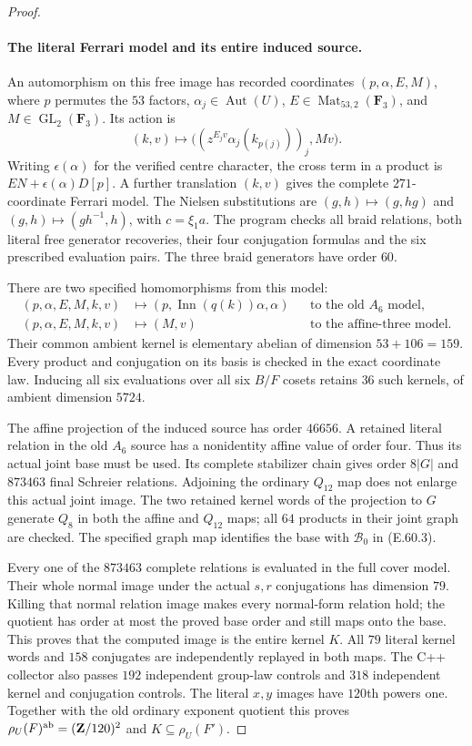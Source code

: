\begin{proof}
\paragraph{The literal Ferrari model and its entire induced source.}
An automorphism on this free image has recorded coordinates
$(p,\alpha,E,M)$, where $p$ permutes the $53$ factors,
$\alpha_j\in\operatorname{Aut}(U)$, $E\in\operatorname{Mat}_{53,2}(\mathbf F_3)$,
and $M\in\operatorname{GL}_2(\mathbf F_3)$. Its action is
\[
 (k,v)\longmapsto
       \bigl((z^{E_jv}\alpha_j(k_{p(j)}))_j,Mv\bigr).
 \tag{E.60.9}
\]
Writing $\epsilon(\alpha)$ for the verified centre character,
the cross term in a product is
$EN+\epsilon(\alpha)D[p]$. A further translation $(k,v)$
gives the complete $271$-coordinate Ferrari model.
The Nielsen substitutions are $(g,h)\mapsto(g,hg)$ and
$(g,h)\mapsto(gh^{-1},h)$, with $c=\xi_1a$.
The program checks all braid relations, both literal free
generator recoveries, their four conjugation formulas and
the six prescribed evaluation pairs. The three braid
generators have order $60$.

There are two specified homomorphisms from this model:
\[
 \begin{aligned}
 (p,\alpha,E,M,k,v)&\longmapsto
              (p,\operatorname{Inn}(q(k))\alpha,\alpha)
                       &&\text{to the old $A_6$ model},\\
 (p,\alpha,E,M,k,v)&\longmapsto(M,v)
                       &&\text{to the affine-three model}.
 \end{aligned}
 \tag{E.60.10}
\]
Their common ambient kernel is elementary abelian of
dimension $53+106=159$. Every product and conjugation
on its basis is checked in the exact coordinate law.
Inducing all six evaluations over all six $B/F$ cosets
retains $36$ such kernels, of ambient dimension $5724$.

The affine projection of the induced source has order
$46656$. A retained literal relation in the old $A_6$
source has a nonidentity affine value of order four.
Thus its actual joint base must be used. Its complete
stabilizer chain gives order $8|G|$ and $873463$ final
Schreier relations. Adjoining the ordinary $Q_{12}$ map
does not enlarge this actual joint image. The two retained
kernel words of the projection to $G$ generate $Q_8$ in
both the affine and $Q_{12}$ maps; all $64$ products in
their joint graph are checked. The specified graph map
identifies the base with $\mathcal B_0$ in
\textup{(E.60.3)}.

Every one of the $873463$ complete relations is evaluated
in the full cover model. Their whole normal image under
the actual $s,r$ conjugations has dimension $79$.
Killing that normal relation image makes every normal-form
relation hold; the quotient has order at most the proved
base order and still maps onto the base. This proves that
the computed image is the entire kernel $K$.
All $79$ literal kernel words and $158$ conjugates are
independently replayed in both maps. The C++ collector
also passes $192$ independent group-law controls and
$318$ independent kernel and conjugation controls.
The literal $x,y$ images have $120$th powers one.
Together with the old ordinary exponent quotient this
proves $\rho_U(F)^{\rm ab}=(\mathbf Z/120)^2$ and
$K\subseteq\rho_U(F')$.


\end{proof}
